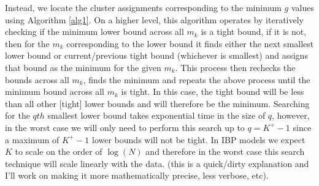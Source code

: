 \documentclass{article}
\numberwithin{equation}{section}
\numberwithin{thm}{section}
\begin{document}
Instead, we locate the cluster assignments corresponding to the minimum $g$ values using Algorithm \ref{alg1}. On a higher level, this algorithm operates by iteratively checking if the minimum lower bound across all $m_k$ is a tight bound, if it is not, then for the $m_k$ corresponding to the lower bound it finds either the next smallest lower bound or current/previous tight bound (whichever is smallest) and assigns that bound as the minimum for the given $m_k$. This process then rechecks the bounds across all $m_k$, finds the minimum and repeats the above process until the minimum bound across all $m_k$ is tight. In this case, the tight bound will be less than all other [tight] lower bounds and will therefore be the minimum. Searching for the $qth$ smallest lower bound takes exponential time in the size of $q$, however, in the worst case we will only need to perform this search up to $q=K^{+} -1$ since a maximum of $K^{+} -1$ lower bounds will not be tight. In IBP models we expect $K$ to scale  on the order of $\log(N)$ and therefore in the worst case this search technique will scale linearly with the data. (this is a quick/dirty explanation and I'll work on making it more mathematically precise, less verbose, etc).
\end{document}
